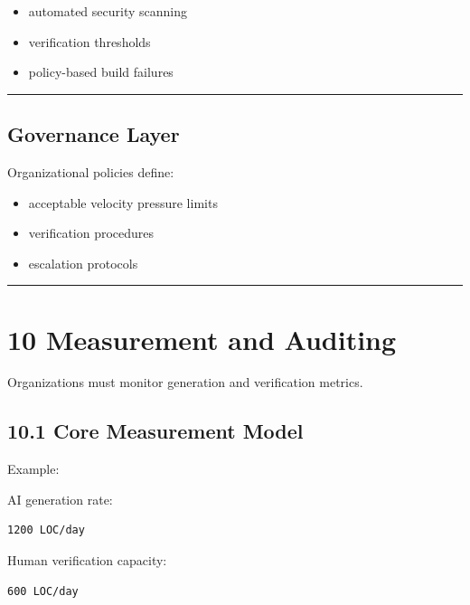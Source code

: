 \documentclass[
]{article}
\providecommand{\tightlist}{%
  \setlength{\itemsep}{0pt}\setlength{\parskip}{0pt}}
\begin{document}
\begin{itemize}
\tightlist
\item
  automated security scanning
\item
  verification thresholds
\item
  policy-based build failures
\end{itemize}

\begin{center}\rule{0.5\linewidth}{0.5pt}\end{center}

\subsection{Governance Layer}\label{governance-layer}

Organizational policies define:

\begin{itemize}
\tightlist
\item
  acceptable velocity pressure limits
\item
  verification procedures
\item
  escalation protocols
\end{itemize}

\begin{center}\rule{0.5\linewidth}{0.5pt}\end{center}

\section{10 Measurement and Auditing}\label{10-measurement-and-auditing}

Organizations must monitor generation and verification metrics.

\subsection{10.1 Core Measurement
Model}\label{101-core-measurement-model}

Example:

AI generation rate:

\begin{verbatim}
1200 LOC/day
\end{verbatim}

Human verification capacity:

\begin{verbatim}
600 LOC/day
\end{verbatim}
\end{document}

